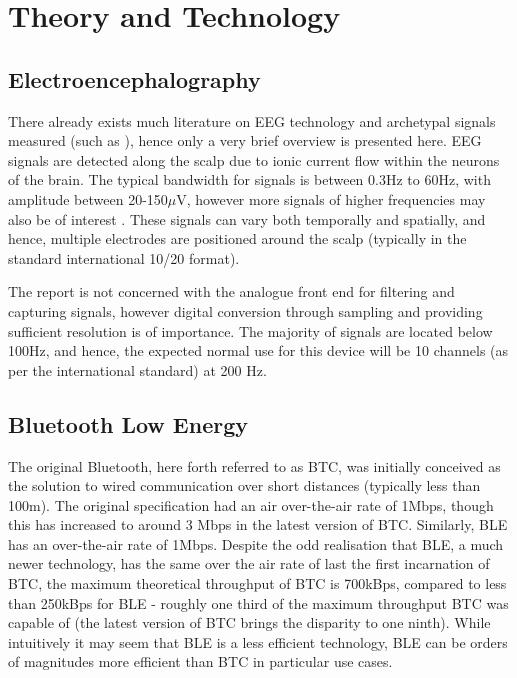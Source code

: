 \documentclass[]{article}
\begin{document}
\clearpage
\section{Theory and Technology}
\subsection{Electroencephalography}

There already exists much literature on \ac{EEG} technology and archetypal signals measured (such as \cite{Teplan2002}), hence only a very brief overview is presented here. \ac{EEG} signals are detected along the scalp due to ionic current flow within the neurons of the brain. The typical bandwidth for signals is between 0.3Hz to 60Hz, with amplitude between 20-150$\mu$V, however more signals of higher frequencies may also be of interest \cite{Urrestarazu2006}. These signals can vary both temporally and spatially, and hence, multiple electrodes are positioned  around the scalp (typically in the standard international 10/20 format).

 The report is not concerned with the analogue front end for filtering and capturing signals, however digital conversion through sampling and providing sufficient resolution is of importance. The majority of signals are located below 100Hz, and hence, the expected normal use for this device will be 10 channels (as per the international standard) at 200 Hz. 


\subsection{Bluetooth Low Energy}
The original Bluetooth, here forth referred to as \ac{BTC}, was initially conceived as the solution to wired communication over short distances (typically less than 100m). The original specification had an air over-the-air rate of 1Mbps, though this has increased to around 3 Mbps in the latest version of \ac{BTC}. Similarly, BLE has an over-the-air rate of 1Mbps. Despite the odd realisation that \ac{BLE}, a much newer technology, has the same over the air rate of last the first incarnation of \ac{BTC}, the maximum theoretical throughput of \ac{BTC} is 700kBps, compared to less than 250kBps for \ac{BLE} - roughly one third of the maximum throughput \ac{BTC} was capable of (the latest version of \ac{BTC} brings the disparity to one ninth). While intuitively it may seem that \ac{BLE} is a less efficient technology, \ac{BLE} can be orders of magnitudes more efficient than \ac{BTC} in particular use cases.
\end{document}

